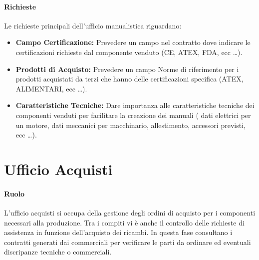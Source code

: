 \documentclass[12pt, a4paper]{article} %
\begin{document}
\paragraph{Richieste}
Le richieste principali dell'ufficio manualistica riguardano:
\begin{itemize}
      \item \textbf{Campo Certificazione:} Prevedere un campo nel contratto dove indicare le certificazioni richieste dal componente venduto (CE, ATEX, FDA, ecc \dots).
      \item \textbf{Prodotti di Acquisto:} Prevedere un campo Norme di riferimento per i prodotti acquistati da terzi che hanno delle certificazioni specifica (ATEX, ALIMENTARI, ecc \dots).
      \item \textbf{Caratteristiche Tecniche:} Dare importanza alle caratteristiche tecniche dei componenti venduti per facilitare la creazione dei manuali ( dati elettrici per un motore, dati meccanici per macchinario, allestimento, accessori previsti, ecc \dots).
\end{itemize}

\section{Ufficio Acquisti}
\paragraph{Ruolo}
L'ufficio acquisti si occupa della gestione degli ordini di acquisto per i
componenti necessari alla produzione. Tra i compiti vi è anche il controllo
delle richieste di assistenza in funzione dell'acquisto dei ricambi. In questa
fase consultano i contratti generati dai commerciali per verificare le parti da
ordinare ed eventuali discripanze tecniche o commerciali.
\end{document}
